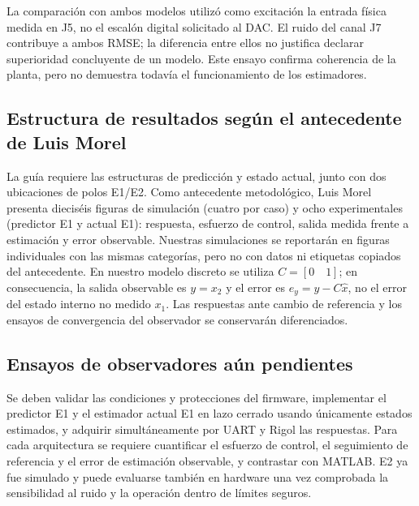 La comparación con ambos modelos utilizó como excitación la entrada
física medida en J5, no el escalón digital solicitado al DAC.
El ruido del canal J7 contribuye a ambos RMSE; la diferencia
entre ellos no justifica declarar superioridad concluyente de un modelo.
Este ensayo confirma coherencia de la planta, pero no demuestra
todavía el funcionamiento de los estimadores.

\subsection{Estructura de resultados según el antecedente de Luis Morel}
La guía requiere las estructuras de predicción y estado actual, junto
con dos ubicaciones de polos E1/E2. Como antecedente metodológico,
Luis Morel presenta dieciséis figuras de simulación (cuatro por caso)
y ocho experimentales (predictor E1 y actual E1): respuesta,
esfuerzo de control, salida medida frente a estimación y error observable.
Nuestras simulaciones se reportarán en figuras individuales con las
mismas categorías, pero no con datos ni etiquetas copiados del antecedente.
En nuestro modelo discreto se utiliza $C=[0\quad 1]$; en consecuencia,
la salida observable es $y=x_2$ y el error es
$e_y=y-C\hat{x}$, no el error del estado interno no medido $x_1$.
Las respuestas ante cambio de referencia y los ensayos de convergencia
del observador se conservarán diferenciados.

\subsection{Ensayos de observadores aún pendientes}
Se deben validar las condiciones y protecciones del firmware, implementar
el predictor E1 y el estimador actual E1 en lazo cerrado usando únicamente
estados estimados, y adquirir simultáneamente por UART y Rigol las respuestas.
Para cada arquitectura se requiere cuantificar el esfuerzo de control,
el seguimiento de referencia y el error de estimación observable, y
contrastar con MATLAB. E2 ya fue simulado y puede evaluarse también
en hardware una vez comprobada la sensibilidad al ruido y la operación
dentro de límites seguros.
